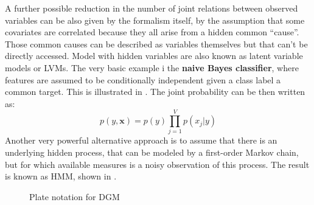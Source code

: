 A further possible reduction in the number of joint relations between observed variables can be also given by the formalism itself,  by the assumption that some covariates are correlated because they all arise from a hidden common “cause”. Those common causes can be described as variables themselves but that can't be directly accessed.  Model with hidden variables are also known as latent variable models or LVMs. 
The very basic example i the \textbf{naive Bayes classifier}, where features are assumed to be conditionally independent given a class label a common target. This is illustrated in \Figure{\ref{fig:naive_bayes}}. The joint probability can be then written as:
\begin{equation}
    p(y,\bm{x}) = p(y) \prod_{j=1}^V p(x_j| y)
\end{equation}
%
Another very powerful alternative approach is to assume that there is an underlying hidden process, that can be modeled by a first-order Markov chain, but for which available measures is a noisy observation of this process. The result is known as \acl{HMM}, shown in \Figure{\ref{fig:hidden_markov}}. 


\begin{figure}
    \centering
    \caption{ Plate notation for DGM }
    \label{fig:plate_notation}
\end{figure}







